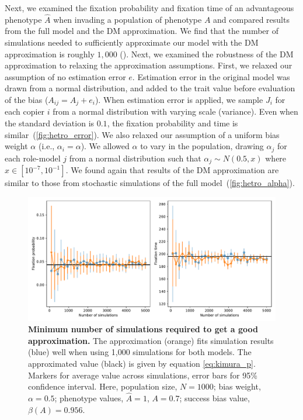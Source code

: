 \documentclass[12pt]{extarticle}
\begin{document}
Next, we examined the fixation probability and fixation time of an advantageous phenotype $\hat{A}$ when invading a population of phenotype $A$ and compared results from the full model and the DM approximation.
We find that the number of simulations needed to sufficiently approximate our model with the DM approximation is roughly $1,000$ ().
Next, we examined the robustness of the DM approximation to relaxing the approximation assumptions.
First, we relaxed our assumption of no estimation error $e$.
Estimation error in the original model was drawn from a normal distribution, and added to the trait value before evaluation of the bias ($A_{ij} = A_j + e_i$).
When estimation error is applied, we sample $J_i$ for each copier $i$ from a normal distribution with varying scale (variance).
Even when the standard deviation is $0.1$, the fixation probability and time is similar~(\cref{fig:hetro_error}). 
We also relaxed our assumption of a uniform bias weight $\alpha$ (i.e., $\alpha_i=\alpha$). We allowed $\alpha$ to vary in the population, drawing $\alpha_j$ for each role-model $j$ from a normal distribution such that $\alpha_j \sim N(0.5,x)$ where $x \in [10^{-7},10^{-1}]$. 
We found again that results of the DM approximation are similar to those from stochastic simulations of the full model~(\cref{fig:hetro_alpha}).



\begin{figure}[h]
    \includegraphics[width=\linewidth]{../figures/binary/num_sims.pdf}
  \caption{
  \textbf{Minimum number of simulations required to get a good approximation.}
  The approximation (orange) fits simulation results (blue) well when using 1,000 simulations for both models. The approximated value (black) is given by equation \cref{eq:kimura_p}.
  Markers for average value across simulations, error bars for 95\% confidence interval.
  Here, population size, $N=1000$; bias weight, $\alpha=0.5$; phenotype values, $\hat{A}=1$, $A=0.7$; success bias value, $\beta(A)=0.956$.}	
  \label{fig:num_sims}
\end{figure}
\end{document}
